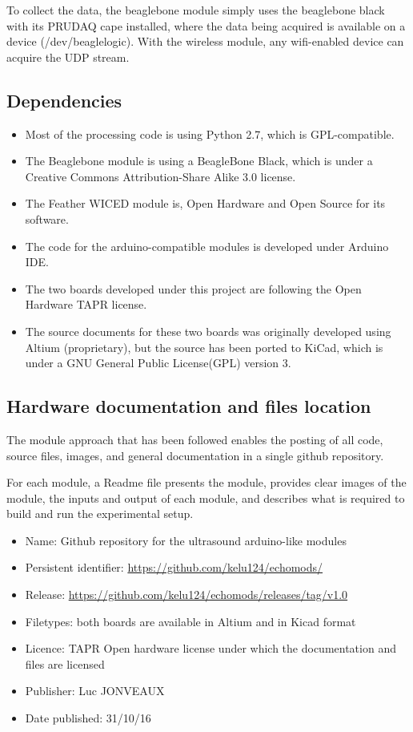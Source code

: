 \documentclass[letterpaper, 10 pt, conference]{ieeeconf} %
\begin{document}
To collect the data, the beaglebone module simply uses the beaglebone black with its PRUDAQ cape installed, where the data being acquired is available on a device (/dev/beaglelogic). With the wireless module, any wifi-enabled device can acquire the UDP stream. 

\subsection{Dependencies}

\begin{itemize}

\item Most of the processing code is using Python 2.7, which is GPL-compatible.
\item The Beaglebone module is using a BeagleBone Black, which is under a Creative Commons Attribution-Share Alike 3.0 license.
\item The Feather WICED module is, Open Hardware and Open Source for its software.
\item The code for the arduino-compatible modules is developed under Arduino IDE.
\item The two boards developed under this project are following the Open Hardware TAPR license. 
\item The source documents for these two boards was originally developed using Altium (proprietary), but the source has been ported to KiCad, which is under a GNU General Public License(GPL) version 3.
\end{itemize}

\subsection{Hardware documentation and files location} 

The module approach that has been followed enables the posting of all code, source files, images, and general documentation in a single github repository.

For each module, a Readme file presents the module, provides clear images of the module, the inputs and output of each module, and describes what is required to build and run the experimental setup.

\begin{itemize}
\item Name: Github repository for the ultrasound arduino-like modules
\item Persistent identifier: \url{https://github.com/kelu124/echomods/}
\item Release: \url{https://github.com/kelu124/echomods/releases/tag/v1.0} 
\item Filetypes: both boards are available in Altium and in Kicad format
\item Licence: TAPR Open hardware license under which the documentation and files are licensed
\item Publisher: Luc JONVEAUX
\item Date published: 31/10/16
\end{itemize}
\end{document}
